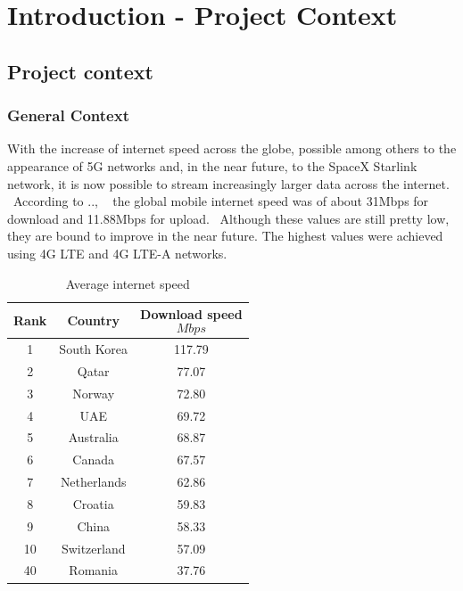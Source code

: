 
\chapter{Introduction - Project Context}
\label{ch:introduction}
\pagestyle{headings}

\section{Project context}
\label{sec:introduction-context}

\subsection{General Context}
\label{subsec:introduction-general-context}
With the increase of internet speed across the globe, possible among others to the appearance of 5G networks and, in
the near future, to the SpaceX Starlink network, it is now possible to stream increasingly larger data across the
internet. \
According to .., \ %
the global mobile internet speed was of about 31Mbps for download and 11.88Mbps for upload. \
Although these values are still pretty low, they are bound to improve in the near future.
The highest values were achieved using 4G LTE and 4G LTE-A networks.

\begin{table}[ht]
    \caption{Average internet speed}
    \centering
    \begin{tabular}{|c|c|c|}
        \hline\hline
        Rank & Country & Download speed \[Mbps\] \\ [0.5ex]
        \hline
        1 & South Korea & 117.79 \\
        2 & Qatar & 77.07  \\
        3 & Norway & 72.80 \\
        4 & UAE & 69.72 \\
        5 & Australia & 68.87 \\
        6 & Canada & 67.57 \\
        7 & Netherlands & 62.86 \\
        8 & Croatia & 59.83 \\
        9 & China & 58.33 \\
        10 & Switzerland & 57.09 \\
        40 & Romania & 37.76
    \end{tabular}
    \label{table:internetSpeed}
\end{table}

